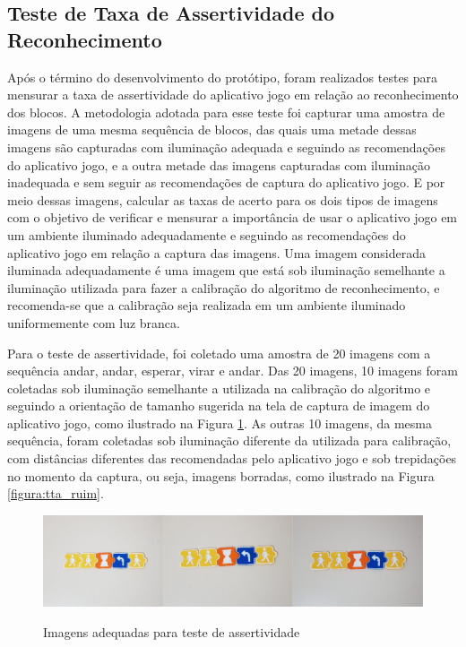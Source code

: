 \subsection{\textbf{Teste de Taxa de Assertividade do Reconhecimento}}

Após o término do desenvolvimento do protótipo, foram realizados testes para mensurar a taxa de assertividade do aplicativo jogo em relação ao reconhecimento dos blocos. A metodologia adotada para esse teste foi capturar uma amostra de imagens de uma mesma sequência de blocos, das quais uma metade dessas imagens são capturadas com iluminação adequada e seguindo as recomendações do aplicativo jogo, e a outra metade das imagens capturadas com iluminação inadequada e sem seguir as recomendações de captura do aplicativo jogo. E por meio dessas imagens, calcular as taxas de acerto para os dois tipos de imagens com o objetivo de verificar e mensurar a importância de usar o aplicativo jogo em um ambiente iluminado adequadamente e seguindo as recomendações do aplicativo jogo em relação a captura das imagens. Uma imagem considerada iluminada adequadamente é uma imagem que está sob  iluminação semelhante a iluminação utilizada para fazer a calibração do algoritmo de reconhecimento, e recomenda-se que a calibração seja realizada em um ambiente iluminado uniformemente com luz branca. 

Para o teste de assertividade, foi coletado uma amostra de 20 imagens com a sequência andar, andar, esperar, virar e andar. Das 20 imagens, 10 imagens foram coletadas sob iluminação semelhante a utilizada na calibração do algoritmo e seguindo a orientação de tamanho sugerida na tela de captura de imagem do aplicativo jogo, como ilustrado na Figura \ref{figura:tta_boa}. As outras 10 imagens, da mesma sequência, foram coletadas sob iluminação diferente da utilizada para calibração, com distâncias diferentes das recomendadas pelo aplicativo jogo e sob trepidações no momento da captura, ou seja, imagens borradas, como ilustrado na Figura \ref{figura:tta_ruim}.

\begin{figure}[H]
    \caption{Imagens adequadas para teste de assertividade}
    \centering
    \includegraphics[width=15cm]{Imagens/Cap5/tta_boa.PNG}
    \label{figura:tta_boa}
\end{figure}

